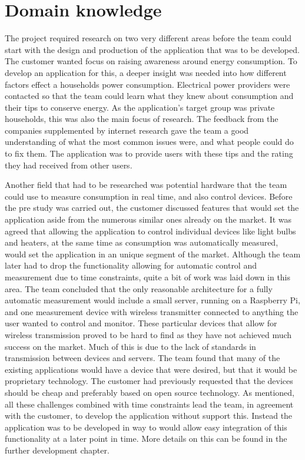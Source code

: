 \section{Domain knowledge}
The project required research on two very different areas before the team could start with the design and production of the application that was to be developed. The customer wanted focus on raising awareness around energy consumption. To develop an application for this, a deeper insight was needed into how different factors effect a households  power consumption. Electrical power providers were contacted so that the team could learn what they knew about consumption and their tips to conserve energy. As the application's target group was private households, this was also the main focus of research. The feedback from the companies supplemented by internet research gave the team a good understanding of what the most common issues were, and what people could do to fix them. The application was to provide users with these tips and the rating they had received from other users. 

Another field that had to be researched was potential hardware that the team could use to measure consumption in real time, and also control devices. Before the pre study was carried out, the customer discussed features that would set the application aside from the numerous similar ones already on the market. It was agreed that allowing the application to control individual devices like light bulbs and heaters, at the same time as consumption was automatically measured, would set the application in an unique segment of the market. Although the team later had to drop the functionality allowing for automatic control and measurement due to time constraints, quite a bit of work was laid down in this area. The team concluded that the only reasonable architecture for a fully automatic measurement would include a small server, running on a Raspberry Pi, and one measurement device with wireless transmitter connected to anything the user wanted to control and monitor. These particular devices that allow for wireless transmission proved to be hard to find as they have not achieved much success on the market. Much of this is due to the lack of standards in transmission between devices and servers. The team found that many of the existing applications would have a device that were desired, but that it would be proprietary technology. The customer had previously requested that the devices should be cheap and preferably based on open source technology. As mentioned, all these challenges combined with time constraints lead the team, in agreement with the customer, to develop the application without support this. Instead the application was to be developed in way to would allow easy integration of this functionality at a later point in time. More details on this can be found in the further development chapter. 